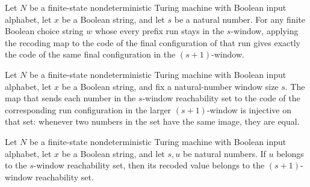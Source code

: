 \begin{lemma}
\label{Complexity.ExpBFS.recode_spec}
\leanok
{}
Let $N$ be a finite-state nondeterministic Turing machine with Boolean input alphabet,
let $x$ be a Boolean string, and let $s$ be a natural number. For any finite Boolean
choice string $w$ whose every prefix run stays in the $s$-window, applying the recoding
map to the code of the final configuration of that run gives exactly the code of the
same final configuration in the $(s+1)$-window.
\end{lemma}

\begin{lemma}
\label{Complexity.ExpBFS.recode_injOn}
\leanok
{}
Let $N$ be a finite-state nondeterministic Turing machine with Boolean input alphabet,
let $x$ be a Boolean string, and fix a natural-number window size $s$. The map that
sends each number in the $s$-window reachability set to the code of the corresponding
run configuration in the larger $(s+1)$-window is injective on that set: whenever two
numbers in the set have the same image, they are equal.
\end{lemma}

\begin{lemma}
\label{Complexity.ExpBFS.recode_mem}
\leanok
{}
Let $N$ be a finite-state nondeterministic Turing machine with Boolean input alphabet,
let $x$ be a Boolean string, and let $s,u$ be natural numbers. If $u$ belongs to the
$s$-window reachability set, then its recoded value belongs to the $(s+1)$-window
reachability set.
\end{lemma}

